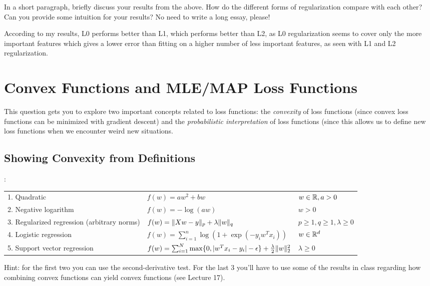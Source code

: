 \documentclass{article}
\begin{document}
In a short paragraph, briefly discuss your results from the above. How do the 
different forms of regularization compare with each other? 
Can you provide some intuition for your results? No need to write a long essay, please! 

According to my results, L0 performs better than L1, which performs better than L2, as L0 regularization seems to cover only the more important features which gives a lower error than fitting on a higher number of less important features, as seen with L1 and L2 regularization.

\section{Convex Functions and MLE/MAP Loss Functions}

This question gets you to explore two important concepts related to loss functions: the \emph{convexity} of loss functions (since convex loss functions can be minimized with gradient descent) and the \emph{probabilistic interpretation} of loss functions (since this allows us to define new loss functions when we encounter weird new situations.


\subsection{Showing Convexity from Definitions}

:
\begin{center}
\begin{tabular}{lll}
1. Quadratic & $f(w) = aw^2 + bw$ & $w \in \mathbb{R}, a > 0$ \\
2. Negative logarithm & $f(w) = -\log(aw) $ & $w > 0$\\
3. Regularized regression (arbitrary norms) &  $f(w) = \|Xw - y\|_p + \lambda\|w\|_q$ & $p \geq 1, q \geq 1, \lambda \geq 0$\\
4. Logistic regression & $f(w) = \sum_{i=1}^n \log(1+\exp(-y_iw^Tx_i)) $& $w \in \mathbb{R}^d$\\
5. Support vector regression & $f(w) = \sum_{i=1}^N\max\{0, |w^Tx_i - y_i| - \epsilon\} + \frac{\lambda}{2}\|w\|_2^2$ & $\lambda \geq 0$\\
\end{tabular}
\end{center}

Hint: for the first two you can use the second-derivative test. For the last 3 you'll have to use some of the results in class regarding how combining convex functions  can yield convex functions (see Lecture 17).
\end{document}
